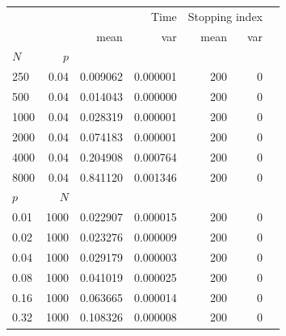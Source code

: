 \begin{tabular}{lrrrrrr}
\toprule
 &  & \multicolumn{2}{r}{Time} & \multicolumn{2}{r}{Stopping index} \\
 &  & mean & var & mean & var \\
$N$ & $ p $ &  &  &  &  &  \\
\midrule
250 & 0.04 & 0.009062 & 0.000001 & 200 & 0\\
500 & 0.04 & 0.014043 & 0.000000 & 200 & 0\\
1000 & 0.04 & 0.028319 & 0.000001 & 200 &0 \\
2000 & 0.04 & 0.074183 & 0.000001 & 200 &0 \\
4000 & 0.04 & 0.204908 & 0.000764 & 200 &0 \\
8000 & 0.04 & 0.841120 & 0.001346 & 200 &0 \\
\midrule
$p$ & $ N $ &  &  &  &  &  \\
\midrule
0.01 & 1000  & 0.022907 & 0.000015 & 200 & 0 \\
0.02 & 1000  & 0.023276 & 0.000009 & 200 & 0 \\
0.04 & 1000  & 0.029179 & 0.000003 & 200 & 0 \\
0.08 & 1000  & 0.041019 & 0.000025 & 200 & 0 \\
0.16 & 1000  & 0.063665 & 0.000014 & 200 & 0 \\
0.32 & 1000  & 0.108326 & 0.000008 & 200 & 0 \\
\bottomrule
\end{tabular}
